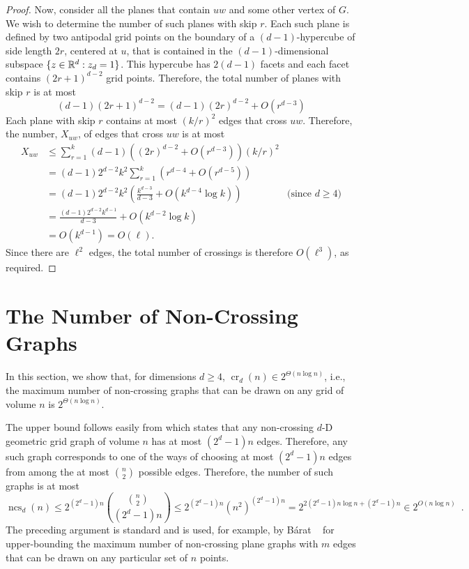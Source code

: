 \documentclass{patmorin}
\DeclareMathOperator{\crs}{cr}
\DeclareMathOperator{\ncs}{ncs}
\begin{document}
\begin{proof}
  Now, consider all the planes that contain $uw$ and some other vertex
  of $G$.  We wish to determine the number of such planes with skip $r$.
  Each such plane is defined by two antipodal grid points on the boundary
  of a $(d-1)$-hypercube of side length $2r$, centered at $u$, that is
  contained in the $(d-1)$-dimensional subspace $\{z\in\mathbb{R}^d:z_d=1\}$.
  This hypercube has $2(d-1)$ facets and each facet contains
  $(2r+1)^{d-2}$ grid points.  Therefore, the total number of planes with
  skip $r$ is at most
  \[
     (d-1)(2r+1)^{d-2} = (d-1)(2r)^{d-2} + O(r^{d-3}) 
  \]
  Each plane with skip $r$ contains at most $(k/r)^2$ edges that cross
  $uw$.  Therefore, the number, $X_{uw}$, of edges that cross $uw$
  is at most
  \begin{align*}
     X_{uw} & \le \sum_{r=1}^k(d-1)\left((2r)^{d-2}+O(r^{d-3})\right)(k/r)^2 \\
         & = (d-1)2^{d-2}k^2\sum_{r=1}^k\left(r^{d-4} + O(r^{d-5})\right) \\
         & = (d-1)2^{d-2}k^2\left(\frac{k^{d-3}}{d-3} 
             + O\left(k^{d-4}\log k\right)\right) 
               & \text{(since $d\ge 4$)} \\
         & = \frac{(d-1)2^{d-2}k^{d-1}}{d-3} + O(k^{d-2}\log k) \\
         & = O(k^{d-1}) = O(\ell).
  \end{align*}
  Since there are $\ell^2$ edges, the total number of crossings is
  therefore $O(\ell^3)$, as required.
\end{proof}

\section{The Number of Non-Crossing Graphs}

In this section, we show that, for dimensions $d\ge 4$, $\crs_d(n)\in
2^{\Theta(n\log n)}$, i.e., the maximum number of non-crossing graphs
that can be drawn on any grid of volume $n$ is $2^{\Theta(n\log n)}$.

The upper bound follows easily from  which states that
any non-crossing $d$-D geometric grid graph of volume $n$ has at most
$(2^d-1)n$ edges.  Therefore, any such graph corresponds to one of
the ways of choosing at most $(2^d-1)n$ edges from among the at most
$\binom{n}{2}$ possible edges.  Therefore, the number of such graphs is
at most
\[
  \ncs_d(n) \le 2^{(2^d-1)n}\binom{\binom{n}{2}}{(2^d-1)n} 
      \le 2^{(2^d-1)n} (n^{2})^{(2^d-1)n} 
      = 2^{2(2^d-1)n\log n+(2^d-1)n} 
      \in 2^{O(n\log n)} \enspace .
\]
The preceding argument is standard and is used, for example, by B\'arat
\etal~\cite[Lemma~4]{barat.matousek.ea:bounded-degree} for upper-bounding
the maximum number of non-crossing plane graphs with $m$ edges that can
be drawn on any particular set of $n$ points.
\end{document}
